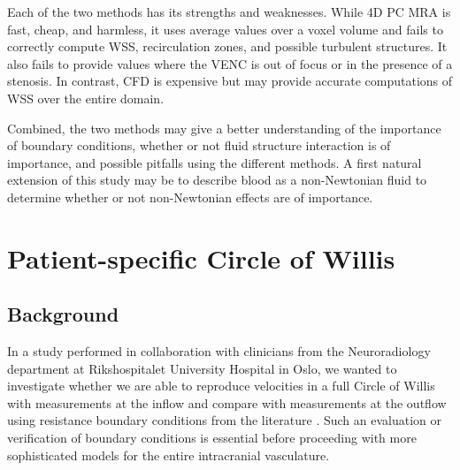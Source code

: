 Each of the two methods has its strengths and weaknesses. While 4D PC
MRA is fast, cheap, and harmless, it uses average values over a voxel
volume and fails to correctly compute WSS, recirculation zones, and
possible turbulent structures. It also fails to provide values where
the VENC is out of focus or in the presence of a stenosis. In
contrast, CFD is expensive but may provide accurate computations of
WSS over the entire domain.

Combined, the two methods may give a better understanding of the
importance of boundary conditions, whether or not fluid structure
interaction is of importance, and possible pitfalls using the
different methods. A first natural extension of this study may be to
describe blood as a non-Newtonian fluid to determine whether or not
non-Newtonian effects are of importance.

\section{Patient-specific Circle of Willis} \label{cok}

\subsection{Background}

In a study performed in collaboration with clinicians from the
Neuroradiology department at Rikshospitalet University Hospital in
Oslo, we wanted to investigate whether we are able to reproduce
velocities in a full Circle of Willis with measurements at the inflow
and compare with measurements at the outflow using resistance boundary
conditions from the
literature \citep{AlastrueyParkerPeiroEtAl2007,Vignon-ClementelFigueroaJansenEtAl2006}.
Such an evaluation or verification of boundary conditions is essential
before proceeding with more sophisticated models for the entire
intracranial vasculature.

